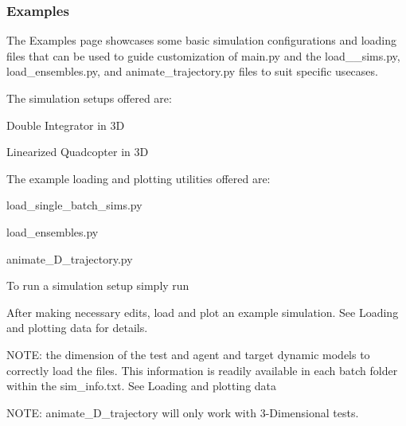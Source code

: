 \begin{DoxyCode}{0}
\end{DoxyCode}


\subsubsection*{Examples}

The Examples page showcases some basic simulation configurations and loading files that can be used to guide customization of main.\+py and the load\+\_\+\+\_\+sims.\+py, load\+\_\+ensembles.\+py, and animate\+\_\+trajectory.\+py files to suit specific usecases.

The simulation setups offered are\+:
\begin{DoxyItemize}
\item Double Integrator in 3D
\item Linearized Quadcopter in 3D
\end{DoxyItemize}

The example loading and plotting utilities offered are\+:
\begin{DoxyItemize}
\item load\+\_\+single\+\_\+batch\+\_\+sims.\+py
\item load\+\_\+ensembles.\+py
\item animate\+\_\+D\+\_\+trajectory.\+py
\end{DoxyItemize}

To run a simulation setup simply run 
\begin{DoxyCode}{0}
\end{DoxyCode}


After making necessary edits, load and plot an example simulation. See \textquotesingle{}Loading and plotting data\textquotesingle{} for details. 
\begin{DoxyCode}{0}
\end{DoxyCode}


N\+O\+TE\+: the dimension of the test and agent and target dynamic models to correctly load the files. This information is readily available in each batch folder within the sim\+\_\+info.\+txt. See \textquotesingle{}Loading and plotting data\textquotesingle{}

N\+O\+TE\+: animate\+\_\+D\+\_\+trajectory will only work with 3-\/Dimensional tests.

